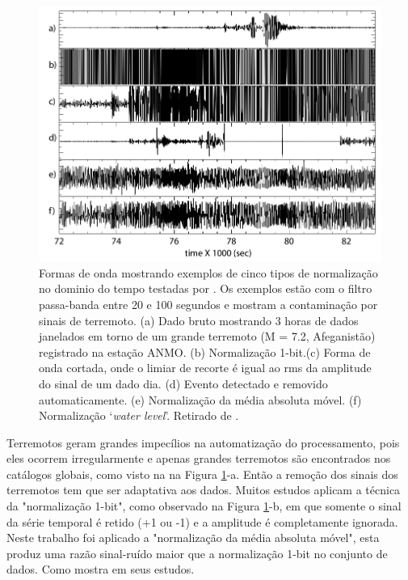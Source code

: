 \begin{figure}[!ht]
\centering
\includegraphics[scale=0.4]{Figs/temporal_norma.png}
\caption[Formas de onda mostrando exemplos de cinco tipos de normalização no dominio do tempo.]{Formas de onda mostrando exemplos de cinco tipos de normalização no dominio do tempo testadas por \cite{bensen_processing_2007}. Os exemplos estão com o filtro passa-banda entre 20 e 100 segundos e mostram a contaminação por sinais de terremoto. (a)  Dado bruto mostrando 3 horas de dados janelados em torno de um grande terremoto (M = 7.2, Afeganistão) registrado na estação ANMO. (b) Normalização 1-bit.(c) Forma de onda cortada, onde o limiar de recorte é igual ao rms da amplitude do sinal de um dado dia. (d) Evento detectado e removido automaticamente. (e) Normalização da média absoluta móvel. (f) Normalização ‘\textit{water level}’. Retirado de \cite{bensen_processing_2007}.}
\label{temporal_norma}
\end{figure} 

Terremotos geram grandes impecílios na automatização do processamento, pois eles ocorrem irregularmente e apenas grandes terremotos são encontrados nos catálogos globais, como visto na na Figura \ref{temporal_norma}-a. Então a remoção dos sinais dos terremotos tem que ser adaptativa aos dados. Muitos estudos aplicam a técnica da "normalização 1-bit", como observado na Figura \ref{temporal_norma}-b, em que somente o sinal da série temporal é retido (+1 ou -1) e a amplitude é completamente ignorada. Neste trabalho foi aplicado a "normalização da média absoluta móvel", esta produz uma razão sinal-ruído maior que a normalização 1-bit no conjunto de dados. Como mostra \cite{seats_improved_2012} em seus estudos.

